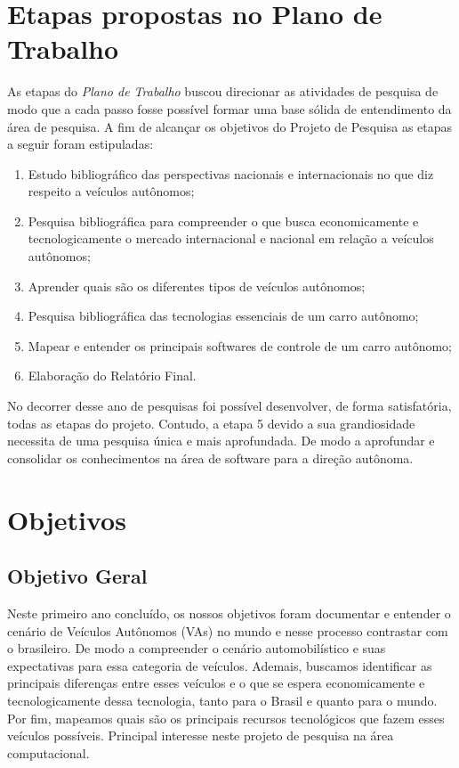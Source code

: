 \chapter{Etapas propostas no Plano de Trabalho} \label{Etapas}
As etapas do \textit{Plano de Trabalho} buscou direcionar as atividades de pesquisa de modo que a cada passo fosse possível formar uma base sólida de entendimento da área de pesquisa. A fim de alcançar os objetivos do Projeto de Pesquisa as etapas a seguir foram estipuladas:
\begin{enumerate}
    \item Estudo bibliográfico das perspectivas nacionais e internacionais no que diz respeito a veículos autônomos;
    \item Pesquisa bibliográfica para compreender o que busca economicamente e tecnologicamente o mercado internacional e nacional em relação a veículos autônomos;
    \item Aprender quais são os diferentes tipos de veículos autônomos;
    \item Pesquisa bibliográfica das tecnologias essenciais de um carro autônomo;
    \item Mapear e entender os principais softwares de controle de um carro autônomo;
    \item Elaboração do Relatório Final.
\end{enumerate}

No decorrer desse ano de pesquisas foi possível desenvolver, de forma satisfatória, todas as etapas do projeto. Contudo, a etapa 5 devido a sua grandiosidade necessita de uma pesquisa única e mais aprofundada. De modo a aprofundar e consolidar os conhecimentos na área de software para a direção autônoma.

\newpage
\chapter{Objetivos} \label{Objetivos}
\section{Objetivo Geral}\label{Objetivo Geral}
Neste primeiro ano concluído, os nossos objetivos foram documentar e entender o cenário de Veículos Autônomos (VAs) no mundo e nesse processo contrastar com o brasileiro. De modo a compreender o cenário automobilístico e suas expectativas para essa categoria de veículos. Ademais, buscamos identificar as principais diferenças entre esses veículos e o que se espera economicamente e tecnologicamente dessa tecnologia, tanto para o Brasil e quanto para o mundo. Por fim, mapeamos quais são os principais recursos tecnológicos que fazem esses veículos possíveis. Principal interesse neste projeto de pesquisa na área computacional. 

